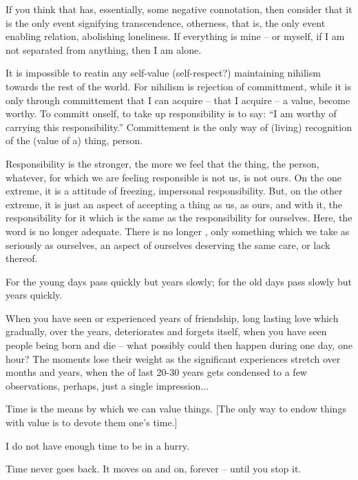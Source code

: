 \pa
If you think that  has, essentially, some negative
connotation, then consider that it is the only event signifying
transcendence, otherness, that is, the only event enabling relation,
abolishing loneliness. If everything is mine -- or myself, if I am not
separated from anything, then I am alone.

\pa
It is impossible to reatin any self-value (self-respect?) maintaining
nihilism towards the rest of the world. For nihilism is rejection of
committment, while it is only through committement that I can acquire -- that
I acquire -- a value, become worthy. To committ onself, to take up
responsibility is to say: ``I am worthy of carrying this responsibility.''
Committement is the only way of (living) recognition of the (value of a)
thing, person.

\pa
Responsibility is the stronger, the more we feel that the thing, the 
person, 
whatever, for which we are feeling responsible is not us, is not ours. 
On the one extreme, it is a  attitude of freezing, 
impersonal responsibility. But, on the other extreme, it is just an 
aspect of accepting a thing as us, as ours, and with it, the 
responsibility for it which is the same as the responsibility for 
ourselves. Here, the word  is no longer adequate. 
There is no longer , only 
something which we take as seriously as ourselves, an aspect of 
ourselves deserving the same care, or lack thereof.


\pa
For the young days pass quickly but years slowly; for the old days pass slowly
but years quickly.

When you have seen or experienced years of friendship, long
lasting love which gradually, over the years, deteriorates and forgets itself,
when you have seen people being born and die -- what possibly could then happen
during one day, one hour? The moments lose their weight as the significant
experiences stretch over months and years, when the  of last 20-30
years gets condensed to a few observations, perhaps, just a single impression...

\pa
Time is the means by which we can value things. [The only way to endow things
with value is to devote them one's time.]

\pa
I do not have enough time to be in a hurry.

\pa
Time never goes back. It moves on and on, forever -- until you stop it.

